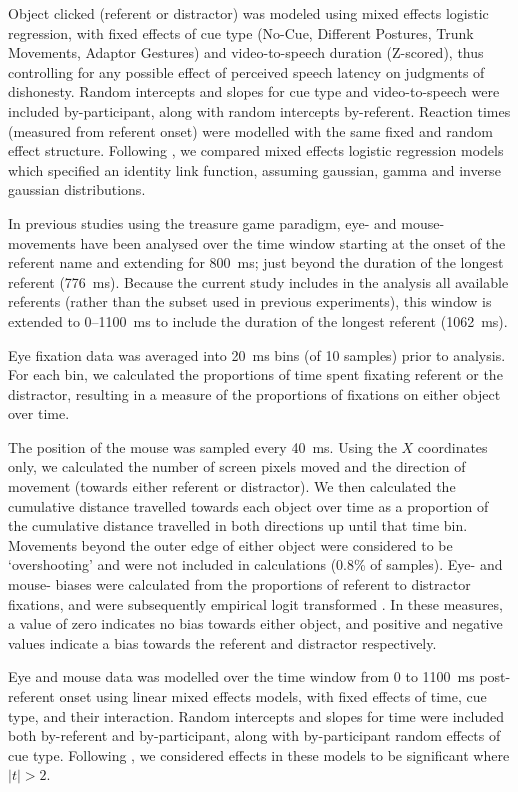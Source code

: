 \documentclass[a4paper,man,natbib]{apa6}
\begin{document}
Object clicked (referent or distractor) was modeled using mixed effects logistic regression, with fixed effects of cue type (No-Cue, Different Postures, Trunk Movements, Adaptor Gestures) and video-to-speech duration (Z-scored), thus controlling for any possible effect of perceived speech latency on judgments of dishonesty.
Random intercepts and slopes for cue type and video-to-speech were included by-participant, along with random intercepts by-referent.
Reaction times (measured from referent onset) were modelled with the same fixed and random effect structure.
Following \citet{Lo2015}, we compared mixed effects logistic regression models which specified an identity link function, assuming gaussian, gamma and inverse gaussian distributions.

In previous studies using the treasure game paradigm, eye- and mouse- movements have been analysed over the time window starting at the onset of the referent name and extending for 800~ms; just beyond the duration of the longest referent (776~ms). 
Because the current study includes in the analysis all available referents (rather than the subset used in previous experiments), this window is extended to 0--1100~ms to include the duration of the longest referent (1062~ms).

Eye fixation data was averaged into 20~ms bins (of 10 samples) prior to analysis.
For each bin, we calculated the proportions of time spent fixating referent or the distractor, resulting in a measure of the proportions of fixations on either object over time.

The position of the mouse was sampled every 40~ms.
Using the $X$ coordinates only, we calculated the number of screen pixels moved and the direction of movement (towards either referent or distractor).
We then calculated the cumulative distance travelled towards each object over time as a proportion of the cumulative distance travelled in both directions up until that time bin.
Movements beyond the outer edge of either object were considered to be `overshooting' and were not included in calculations (0.8\% of samples).
Eye- and mouse- biases were calculated from the proportions of referent to distractor fixations, and were subsequently empirical logit transformed \citep{Barr2008}. 
In these measures, a value of zero indicates no bias towards either object, and positive and negative values indicate a bias towards the referent and distractor respectively.

Eye and mouse data was modelled over the time window from 0 to 1100~ms post-referent onset using linear mixed effects models, with fixed effects of time, cue type, and their interaction.
Random intercepts and slopes for time were included both by-referent and by-participant, along with by-participant random effects of cue type.
Following \citet{Baayen2008}, we considered effects in these models to be significant where $|t|>2$.
\end{document}

